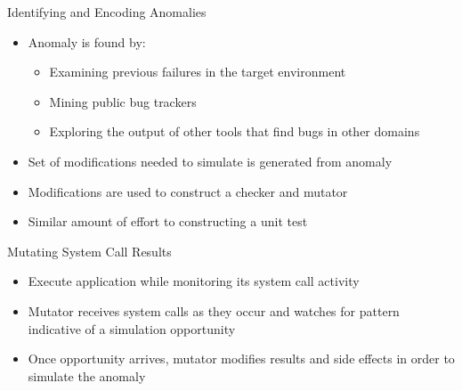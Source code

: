 \documentclass[pdf]{beamer}
\begin{document}
\begin{frame}{Identifying and Encoding Anomalies}
  \begin{itemize}
  \item{Anomaly is found by:}
    \begin{itemize}
    \item{Examining previous failures in the target environment}
    \item{Mining public bug trackers}
    \item{Exploring the output of other tools that find bugs in other
      domains}
    \end{itemize}
  \item{Set of modifications needed to simulate is generated from anomaly}
  \item{Modifications are used to construct a checker and mutator}
  \item{Similar amount of effort to constructing a unit test}
  \end{itemize}
\end{frame}


\begin{frame}{Mutating System Call Results}
  \begin{itemize}
  \item{Execute application while monitoring its system call activity}
  \item{Mutator receives system calls as they occur and watches for pattern
    indicative of a simulation opportunity}
  \item{Once opportunity arrives, mutator modifies results and side effects
    in order to simulate the anomaly}
  \end{itemize}
\end{frame}
\end{document}
